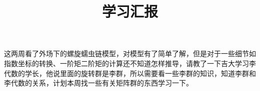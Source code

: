 \documentclass[12pt,a4paper]{article}
\title{学习汇报}
\begin{document}
\maketitle
这两周看了外场下的螺旋蠕虫链模型，对模型有了简单了解，但是对于一些细节如指数坐标的转换、一阶矩二阶矩的计算还不知道怎样推导，请教了一下吉大学习李代数的学长，他说里面的旋转群是李群，所以需要看一些李群的知识，知道李群和李代数的关系，计划本周找一些有关矩阵群的东西学习一下。
\end{document}
